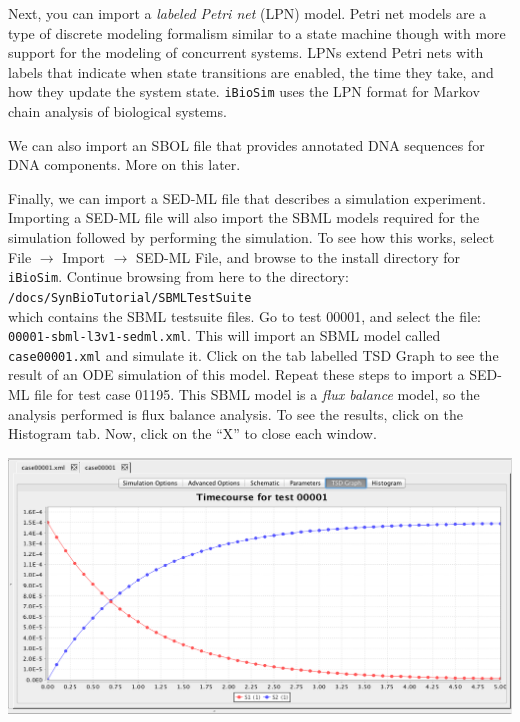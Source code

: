 \documentclass[titlepage,11pt]{article}
\begin{document}
Next, you can import a \emph{labeled Petri net} (LPN) model.  Petri net models are a type of discrete modeling formalism similar to a state machine though with more support for the modeling of concurrent systems.  LPNs extend Petri nets with labels that indicate when state transitions are enabled, the time they take, and how they update the system state.  {\tt iBioSim} uses the LPN format for Markov chain analysis of biological systems.  

We can also import an SBOL file that provides annotated DNA sequences for DNA components.  More on this later.  

Finally, we can import a SED-ML file that describes a simulation experiment. 
Importing a SED-ML file will also import the SBML models required for the simulation followed by performing the simulation.   To see how this works, select File $\rightarrow$ Import $\rightarrow$ SED-ML File, and browse to the install directory for {\tt iBioSim}.  Continue browsing from here to the directory:\\
{\tt <INSTALL DIRECTORY>/docs/SynBioTutorial/SBMLTestSuite} \\
which contains the SBML testsuite files.  Go to test 00001, and select the file:\\
{\tt 00001-sbml-l3v1-sedml.xml}.  This will import an SBML model called {\tt case00001.xml} and simulate it.  Click on the tab labelled TSD Graph to see the result of an ODE simulation of this model.  Repeat these steps to import a SED-ML file for test case 01195.  This SBML model is a \emph{flux balance} model, so the analysis performed is flux balance analysis.  To see the results, click on the Histogram tab.  Now, click on the ``X'' to close each window.

\begin{center}
\includegraphics[width=160mm]{screenshots/TestSuiteResults}
\end{center}
\end{document}
